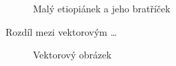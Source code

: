 \documentclass[a4paper, 11pt]{article}
\begin{document}
\begin{figure}[!ht]
{         }
        \caption{Malý etiopiánek a jeho bratříček}
        \label{fig:Obrázek 1}
    \end{figure}
    
\pagebreak

    Rozdíl mezi vektorovým \dots

    \begin{figure}[!ht]
        \centering
        \caption{Vektorový obrázek}
        \label{fig:Obrázek 2}
    \end{figure}
\end{document}
